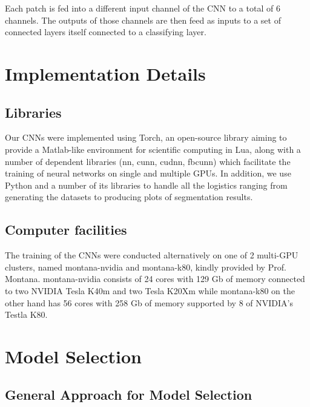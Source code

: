 \noindent Each patch is fed into a different input channel of the CNN to a total of 6 channels. The outputs of those channels are then feed as inputs to a set of connected layers itself connected to a classifying layer.

\section{Implementation Details}

\subsection{Libraries}

\noindent Our CNNs were implemented using Torch, an open-source library aiming to provide a Matlab-like environment for scientific computing in Lua, along with a number of dependent libraries (nn, cunn, cudnn, fbcunn) which facilitate the training of neural networks on single and multiple GPUs. In addition, we use Python and a number of its libraries to handle all the logistics ranging from generating the datasets to producing plots of segmentation results.

\subsection{Computer facilities}

\noindent The training of the CNNs were conducted alternatively on one of 2 multi-GPU clusters, named montana-nvidia and montana-k80, kindly provided by Prof. Montana. montana-nvidia consists of 24 cores with 129 Gb of memory connected to two NVIDIA Tesla K40m and two Tesla K20Xm while montana-k80 on the other hand has 56 cores with 258 Gb of memory supported by 8 of NVIDIA's Testla K80. 

\section{Model Selection}

\subsection{General Approach for Model Selection}

